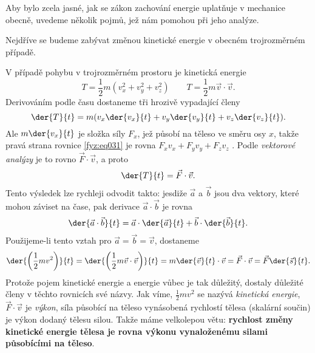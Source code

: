     Aby bylo zcela jasné, jak se zákon zachování energie uplatňuje v mechanice obecně, uvedeme    
    několik pojmů, jež nám pomohou při jeho analýze.
    
    Nejdříve se budeme zabývat změnou kinetické energie v obecném trojrozměrném případě.
    
    V případě pohybu v trojrozměrném prostoru je kinetická energie
    \begin{equation}\label{fyz:eq030}
      T = \frac{1}{2}m(v_x^2 + v_y^2 + v_z^2) \quad\quad 
      T = \frac{1}{2}m\vec{v}\cdot\vec{v}.
    \end{equation}
    Derivováním podle času dostaneme tři hrozivě vypadající členy
    \begin{equation}\label{fyz:eq031}
      \der{T}{t} = m(v_x\der{v_x}{t} + v_y\der{v_y}{t} + v_z\der{v_z}{t}).
    \end{equation}
    Ale \(m\der{v_x}{t}\) je složka síly \(F_x\), jež působí na těleso ve směru osy \(x\), takže 
    pravá strana rovnice \ref{fyz:eq031} je rovna \(F_xv_x + F_yv_y + F_zv_z\) . Podle 
    \emph{vektorové analýzy} je to rovno \(\vec{F}\cdot\vec{v}\), a proto
    \begin{equation}\label{fyz:eq032}
      \der{T}{t} = \vec{F}\cdot\vec{v}.
    \end{equation}
    Tento výsledek lze rychleji odvodit takto: jesdiže \(\vec{a}\) a \(\vec{b}\) jsou dva vektory, 
    které mohou záviset na čase, pak derivace \(\vec{a}\cdot\vec{b}\) je rovna
    \begin{equation}\label{fyz:eq033}
      \der{\vec{a}\cdot\vec{b}}{t} = \vec{a}\cdot\der{\vec{a}}{t} + \vec{b}\cdot\der{\vec{b}}{t}.
    \end{equation}
    Použijeme-li tento vztah pro \(\vec{a}=\vec{b}=\vec{v}\), dostaneme
    \begin{equation}\label{fyz:eq034}
      \der{\left(\frac{1}{2}mv^2\right)}{t} = 
      \der{\left(\frac{1}{2}m\vec{v}\cdot\vec{v}\right)}{t} = 
      m\der{\vec{v}}{t}\cdot\vec{v} = 
      \vec{F}\cdot\vec{v} = 
      \vec{F}\der{\vec{s}}{t}.
    \end{equation}
    Protože pojem kinetické energie a energie vůbec je tak důležitý, dostaly důležité členy v 
    těchto rovnicích své názvy. Jak víme, \(\frac{1}{2}mv^2\) se nazývá \emph{kinetická energie}, 
    \(\vec{F}\cdot\vec{v}\) je \emph{výkon}, síla působící na těleso vynásobená rychlostí tělesa 
    (skalární součin) je výkon dodaný tělesu silou. Takže máme velkolepou větu: \textbf{rychlost 
    změny kinetické energie tělesa je rovna výkonu vynaloženému silami působícími na těleso}.
    
